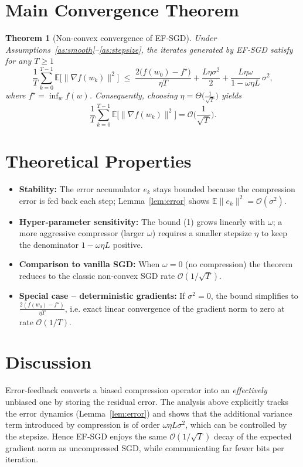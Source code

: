 \documentclass{article}
\newtheorem{theorem}{Theorem}
\newcommand{\E}{\mathbb{E}}
\begin{document}
\section*{Main Convergence Theorem}
\begin{theorem}[Non‑convex convergence of EF‑SGD]\label{thm:main}
Under Assumptions~\ref{as:smooth}–\ref{as:stepsize}, the iterates generated by EF‑SGD satisfy for any $T\ge1$
\[
    \frac{1}{T}\sum_{k=0}^{T-1}\E\!\big[\|\nabla f(w_k)\|^{2}\big]
    \;\le\;
    \frac{2\big(f(w_0)-f^{\star}\big)}{\eta T}
    +\frac{L\eta\sigma^{2}}{2}
    +\frac{L\eta\omega}{1-\omega\eta L}\,\sigma^{2},
\tag{1}
\]
where $f^{\star}=\inf_{w}f(w)$. Consequently, choosing $\eta= \Theta\big(\frac{1}{\sqrt{T}}\big)$ yields
\[
    \frac{1}{T}\sum_{k=0}^{T-1}\E\!\big[\|\nabla f(w_k)\|^{2}\big]=\mathcal{O}\!\Big(\frac{1}{\sqrt{T}}\Big).
\]
\end{theorem}

\section*{Theoretical Properties}
\begin{itemize}
    \item \textbf{Stability:} The error accumulator $e_k$ stays bounded because the compression error is fed back each step; Lemma~\ref{lem:error} shows $\E\|e_k\|^{2}= \mathcal{O}(\sigma^{2})$.
    \item \textbf{Hyper‑parameter sensitivity:} The bound (1) grows linearly with $\omega$; a more aggressive compressor (larger $\omega$) requires a smaller stepsize $\eta$ to keep the denominator $1-\omega\eta L$ positive.
    \item \textbf{Comparison to vanilla SGD:} When $\omega=0$ (no compression) the theorem reduces to the classic non‑convex SGD rate $\mathcal{O}(1/\sqrt{T})$.
    \item \textbf{Special case – deterministic gradients:} If $\sigma^{2}=0$, the bound simplifies to $\frac{2(f(w_0)-f^{\star})}{\eta T}$, i.e. exact linear convergence of the gradient norm to zero at rate $\mathcal{O}(1/T)$.
\end{itemize}

\section*{Discussion}
Error‑feedback converts a biased compression operator into an \emph{effectively} unbiased one by storing the residual error. The analysis above explicitly tracks the error dynamics (Lemma~\ref{lem:error}) and shows that the additional variance term introduced by compression is of order $\omega\eta L\sigma^{2}$, which can be controlled by the stepsize. Hence EF‑SGD enjoys the same $\mathcal{O}(1/\sqrt{T})$ decay of the expected gradient norm as uncompressed SGD, while communicating far fewer bits per iteration.
\end{document}
